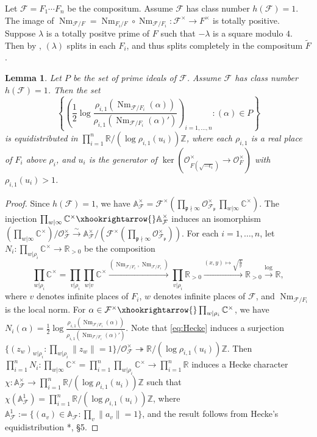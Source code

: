 \documentclass{amsart}
\numberwithin{equation}{subsection}
\numberwithin{theorem}{section}
\newtheorem{lemma}[theorem]{Lemma}
\theoremstyle{definition}
\theoremstyle{remark}
\newcommand{\bA}{\mathbb{A}}
\newcommand{\bC}{\mathbb{C}}
\newcommand{\bR}{\mathbb{R}}
\newcommand{\bZ}{\mathbb{Z}}
\newcommand{\cF}{\mathcal{F}}
\newcommand{\cO}{\mathcal{O}}
\DeclareMathOperator{\Nm}{Nm}
\begin{document}
Let $\cF =F_1\cdots F_n$ be the compositum. Assume $\cF$ has class number $h(\cF) = 1$. The image of $\Nm_{\cF/F} = \Nm_{F_i/F}\circ \Nm_{\cF/F_i}: \cF^\times \to F^\times$ is totally positive. Suppose $\lambda$ is a totally positve prime of $F$ such that $-\lambda$ is a square modulo $4$. Then by ,  $(\lambda)$ splits in each $F_i$, and thus splits completely in the compositum $\tilde{F}$. 

\begin{lemma}\label{lem:equidistribution}
    Let $P$ be the set of prime ideals of $\cF$. Assume $\cF$ has class number $h(\cF) = 1$. Then the set \[\left\{\left(\frac{1}{2}\log\frac{\rho_{i,1}(\Nm_{\cF/F_i}(\alpha))}{\rho_{i,1}(\Nm_{\cF/F_i}(\alpha)')}\right)_{i=1, \dotsc, n}: (\alpha) \in P\right\}\] is equidistributed in $\prod_{i=1}^n \bR/(\log \rho_{i,1}(u_i))\bZ$, where each $\rho_{i,1}$ is a real place of $F_i$ above $\rho_i$, and $u_i$ is the generator of $\ker(\cO_{F(\sqrt{-\epsilon_i})}^\times \to \cO_F^\times)$ with $\rho_{i,1}(u_i) > 1$. 
\end{lemma}
\begin{proof}
    Since $h(\cF) = 1$, we have $\mathbb{A}_{\cF}^\times = \cF^\times (\prod_{\mathfrak{p}\nmid \infty}\mathcal{O}_{\cF_\mathfrak{p}}^\times \, \prod_{w | \infty} \mathbb{C}^\times)$. The injection $\prod_{w | \infty} \mathbb{C}^\times \xhookrightarrow{}\mathbb{A}_{\cF}^\times$ induces an isomorphism $(\prod_{w | \infty} \mathbb{C}^\times)/\mathcal{O}_{\cF}^\times \xrightarrow{\sim}\mathbb{A}_{\cF}^\times /(\cF^\times (\prod_{\mathfrak{p}\nmid \infty}\mathcal{O}_{\cF_\mathfrak{p}}^\times))$. For each $i=1, \dotsc,n$, let $N_i: \prod_{w | \rho_i} \mathbb{C}^\times \to \bR_{>0}$ be the composition \begin{equation} \label{eq:Hecke}
        \prod_{w | \rho_i}  \mathbb{C}^\times  = \prod_{v | \rho_i} \prod_{w|v} \bC^\times\xrightarrow{(\Nm_{\cF/F_i}, \Nm_{\cF/F_i})} \prod_{v|\rho_i} \bR_{>0} \xrightarrow{(x,y)\mapsto \sqrt{\frac{x}{y}}} \bR_{>0} \xrightarrow{\log} \bR,
    \end{equation} where $v$ denotes infinite places of $F_i$, $w$ denotes infinite places of $\cF$, and $\Nm_{\cF/F_i}$ is the local norm. For $\alpha \in \cF^\times \xhookrightarrow{} \prod_{w|\rho_i}\bC^\times$, we have $N_i(\alpha) = \frac{1}{2} \log \frac{\rho_{i,1}(\Nm_{\cF/F_i}(\alpha))}{\rho_{i,1}(\Nm_{\cF/F_i}(\alpha)')}$. Note that \eqref{eq:Hecke} induces a surjection $\{(z_w)_{w|\rho_i}: \prod_{w|\rho_i}\|z_w\| = 1\}/\cO_{\cF}^\times \twoheadrightarrow{}\bR/(\log \rho_{i,1}(u_i))\bZ$. Then $\prod_{i=1}^n N_i: \prod_{w|\infty}\bC^\times = \prod_{i=1}^n\prod_{w|\rho_i}\bC^\times \to \prod_{i=1}^n \bR$ induces a Hecke character $\chi: \bA_\cF^\times \to \prod_{i=1}^n\bR/(\log \rho_{i,1}( u_i)) \bZ$ such that $\chi(\bA_\cF^1) = \prod_{i=1}^n\bR/(\log\rho_{i,1}( u_i)) \bZ$, where $\bA_\cF^1 := \{(a_v)\in\bA_\cF:\prod_v\|a_v\|=1\}$, and the result follows from Hecke's equidistribution \cite{MR1282723}*{\MakeUppercase{}, \S5}.
\end{proof}
\end{document}
